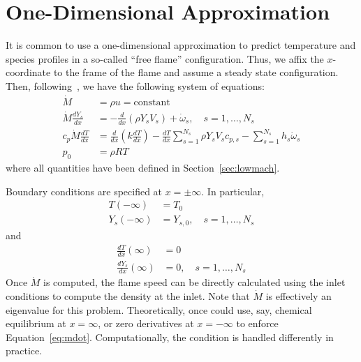 
\section{One-Dimensional Approximation}\label{sec:1d}

It is common to use a one-dimensional approximation to predict
temperature and species profiles in a so-called ``free flame''
configuration. Thus, we affix the $x$-coordinate to the frame of the
flame and assume a steady state configuration. Then,
following~\cite{Smooke}, we have the following system of equations:
%
\begin{align}
  \dot{M} &= \rho u = \text{constant}\label{eq:mdot}\\
  \dot{M} \frac{dY_s}{dx} &= -\frac{d}{dx}\left( \rho Y_s V_s\right) +
  \dot{\omega}_s, \quad s=1,\dots,N_s \\
  c_p \dot{M} \frac{dT}{dx} &= \frac{d}{dx}\left( k \frac{dT}{dx}
  \right) - \frac{dT}{dx}\sum_{s=1}^{N_s} \rho Y_s V_s c_{p,s}  -
  \sum_{s=1}^{N_s} h_s \dot{\omega}_s \\
   p_0 &= \rho R T
\end{align}
%
where all quantities have been defined in
Section~\ref{sec:lowmach}.

Boundary conditions are specified at $x =
\pm \infty$. In particular,
%
\begin{align}
  T(-\infty) &= T_0 \\
  Y_s(-\infty) &= Y_{s,0}, \quad s = 1,\dots,N_s
\end{align}
%
and
%
\begin{align}
  \frac{dT}{dx}(\infty) &= 0 \\
  \frac{dY_s}{dx}(\infty) &= 0, \quad s = 1,\dots,N_s
\end{align}
%
Once $\dot{M}$ is computed, the flame speed can be directly calculated
using the inlet conditions to compute the density at the inlet.
Note that $\dot{M}$ is effectively an eigenvalue for this problem.
Theoretically, once could use, say, chemical equilibrium at
$x=\infty$, or zero derivatives at $x=-\infty$ to enforce
Equation~\eqref{eq:mdot}. Computationally, the condition is handled
differently in practice.


